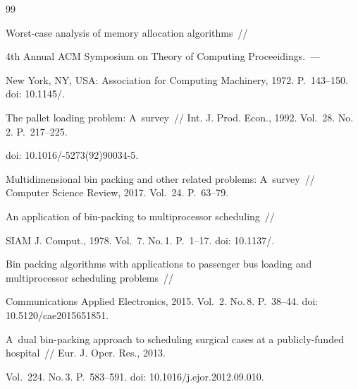 {\small\frenchspacing

{%


\begin{thebibliography}{99}




 Worst-case analysis of memory allocation algorithms~/\!\!/ 

4th Annual ACM Symposium on Theory of Computing Proceeidings.~--- 

New York, NY, USA: Association for Computing Machinery, 1972. P.~143--150. doi: 10.1145\!/.


 The pallet loading problem: A~survey~/\!\!/ Int. J.  Prod. Econ., 1992. Vol.~28. No.\,2. P.~217--225. 

doi: 10.1016\!/-5273(92)90034-5.



Multidimensional bin packing and other related problems: A~survey~/\!\!/ Computer Science Review, 2017. Vol.~24. P.~63--79. 


 An application of bin-packing to multiprocessor scheduling~/\!\!/ 

SIAM J. Comput., 1978. Vol.~7. No.\,1. P.~1--17. doi: 10.1137\!/.


 Bin packing algorithms with applications to passenger bus loading and multiprocessor scheduling problems~/\!\!/ 

Communications Applied Electronics, 2015. Vol.~2. No.\,8. P.~38--44. doi: 10.5120\!/\!cae2015651851.



A~dual bin-packing approach to scheduling surgical cases at a publicly-funded hospital~/\!\!/ Eur. J. Oper. Res., 2013. 

Vol.~224. No.\,3. P.~583--591. doi: 10.1016\!/\!j.ejor.2012.09.010.



\end{thebibliography}}}
